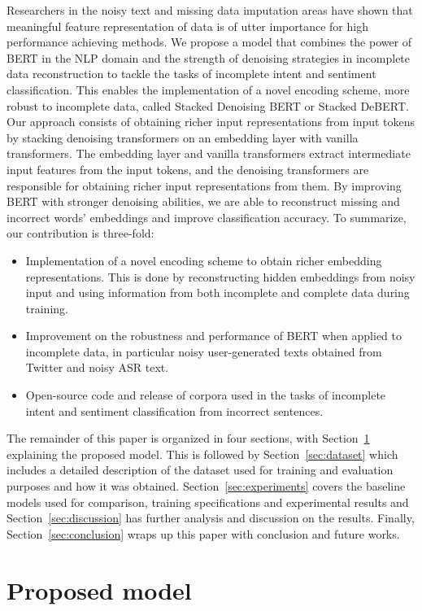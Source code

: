 \documentclass[review]{elsarticle}
\begin{document}
Researchers in the noisy text and missing data imputation areas have shown that meaningful feature representation of data is of utter importance for high performance achieving methods. We propose a model that combines the power of BERT in the NLP domain and the strength of denoising strategies in incomplete data reconstruction to tackle the tasks of incomplete intent and sentiment classification. This enables the implementation of a novel encoding scheme, more robust to incomplete data, called Stacked Denoising BERT or Stacked DeBERT. Our approach consists of obtaining richer input representations from input tokens by stacking denoising transformers on an embedding layer with vanilla transformers. The embedding layer and vanilla transformers extract intermediate input features from the input tokens, and the denoising transformers are responsible for obtaining richer input representations from them. By improving BERT with stronger denoising abilities, we are able to reconstruct missing and incorrect words' embeddings and improve classification accuracy. To summarize, our contribution is three-fold:
\begin{itemize}
    \item Implementation of a novel encoding scheme to obtain richer embedding representations. This is done by reconstructing hidden embeddings from noisy input and using information from both incomplete and complete data during training.
    \item Improvement on the robustness and performance of BERT when applied to incomplete data, in particular noisy user-generated texts obtained from Twitter and noisy ASR text.
    \item Open-source code and release of corpora used in the tasks of incomplete intent and sentiment classification from incorrect sentences. 
\end{itemize}

The remainder of this paper is organized in four sections, with Section~\ref{sec:proposed_model} explaining the proposed model. This is followed by Section~\ref{sec:dataset} which includes a detailed description of the dataset used for training and evaluation purposes and how it was obtained. Section~\ref{sec:experiments} covers the baseline models used for comparison, training specifications and experimental results and Section~\ref{sec:discussion} has further analysis and discussion on the results. Finally, Section~\ref{sec:conclusion} wraps up this paper with conclusion and future works.

\section{Proposed model}
\label{sec:proposed_model}
\end{document}
